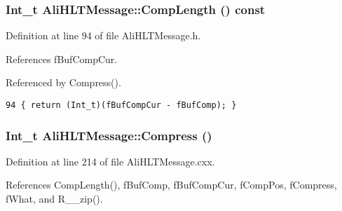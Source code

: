 \subsubsection{\setlength{\rightskip}{0pt plus 5cm}Int\_\-t Ali\-HLTMessage::Comp\-Length () const\hspace{0.3cm}{\tt  [inline]}}\label{classAliHLTMessage_a15}




Definition at line 94 of file Ali\-HLTMessage.h.

References f\-Buf\-Comp\-Cur.

Referenced by Compress().

\footnotesize\begin{verbatim}94 { return (Int_t)(fBufCompCur - fBufComp); }
\end{verbatim}\normalsize 


\subsubsection{\setlength{\rightskip}{0pt plus 5cm}Int\_\-t Ali\-HLTMessage::Compress ()}\label{classAliHLTMessage_a12}




Definition at line 214 of file Ali\-HLTMessage.cxx.

References Comp\-Length(), f\-Buf\-Comp, f\-Buf\-Comp\-Cur, f\-Comp\-Pos, f\-Compress, f\-What, and R\_\-\_\-zip().


